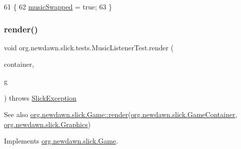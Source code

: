 \begin{DoxyCode}
61                                                           \{
62         \mbox{\hyperlink{classorg_1_1newdawn_1_1slick_1_1tests_1_1_music_listener_test_a00672f601ac67a12c1fb5218a89b1a6c}{musicSwapped}} = \textcolor{keyword}{true};
63     \}
\end{DoxyCode}
\mbox{\label{classorg_1_1newdawn_1_1slick_1_1tests_1_1_music_listener_test_adbd4e2676732a88fecdc3a700390a78a}} 
\subsubsection{\texorpdfstring{render()}{render()}}
{\footnotesize\ttfamily void org.\+newdawn.\+slick.\+tests.\+Music\+Listener\+Test.\+render (\begin{DoxyParamCaption}\item[{\mbox{\hyperlink{classorg_1_1newdawn_1_1slick_1_1_game_container}{Game\+Container}}}]{container,  }\item[{\mbox{\hyperlink{classorg_1_1newdawn_1_1slick_1_1_graphics}{Graphics}}}]{g }\end{DoxyParamCaption}) throws \mbox{\hyperlink{classorg_1_1newdawn_1_1slick_1_1_slick_exception}{Slick\+Exception}}\hspace{0.3cm}{\ttfamily [inline]}}

\begin{DoxySeeAlso}{See also}
\mbox{\hyperlink{interfaceorg_1_1newdawn_1_1slick_1_1_game_af1a4670d43eb3ba04dfcf55ab1975b64}{org.\+newdawn.\+slick.\+Game\+::render}}(\mbox{\hyperlink{classorg_1_1newdawn_1_1slick_1_1_game_container}{org.\+newdawn.\+slick.\+Game\+Container}}, \mbox{\hyperlink{classorg_1_1newdawn_1_1slick_1_1_graphics}{org.\+newdawn.\+slick.\+Graphics}}) 
\end{DoxySeeAlso}


Implements \mbox{\hyperlink{interfaceorg_1_1newdawn_1_1slick_1_1_game_af1a4670d43eb3ba04dfcf55ab1975b64}{org.\+newdawn.\+slick.\+Game}}.


